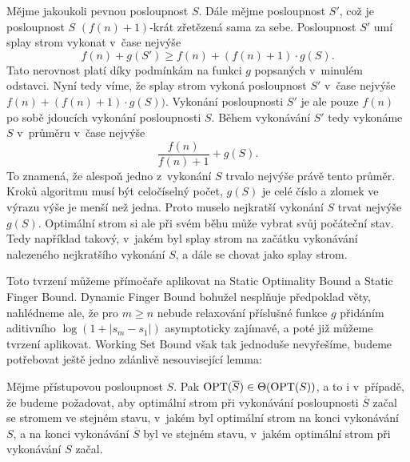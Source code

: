 \begin{dukaz}
Mějme jakoukoli pevnou posloupnost $S$. Dále mějme posloupnost $S'$, což je posloupnost $S$ $(f(n)+1)$-krát zřetězená sama za sebe. Posloupnost $S'$ umí splay strom
vykonat v~čase nejvýše $$f(n) + g(S') \geq f(n) + (f(n)+1) \cdot g(S).$$ Tato
nerovnost platí díky podmínkám na funkci $g$ popsaných v~minulém odstavci. Nyní
tedy víme, že splay strom vykoná posloupnost $S'$ v~čase nejvýše
$f(n)+(f(n)+1)\cdot g(S))$. Vykonání posloupnosti $S'$ je ale pouze $f(n)$ po
sobě jdoucích vykonání posloupnosti $S$. Během vykonávání $S'$ tedy vykonáme
$S$ v~průměru v~čase nejvýše $$\frac{f(n)}{f(n)+1}+g(S).$$ To znamená, že
alespoň jedno z~vykonání $S$ trvalo nejvýše právě tento průměr.
Kroků algoritmu musí být celočíselný počet, $g(S)$ je celé číslo a zlomek ve výrazu
výše je menší než jedna. Proto muselo nejkratší vykonání $S$ trvat nejvýše $g(S)$.
Optimální strom si ale při svém běhu může vybrat svůj počáteční stav. Tedy například takový, v~jakém byl splay strom na začátku
vykonávání nalezeného nejkratšího vykonání $S$, a dále se chovat jako
splay strom.
\end{dukaz}

Toto tvrzení můžeme přímočaře aplikovat na Static Optimality Bound a Static
Finger Bound. Dynamic Finger Bound bohužel nesplňuje předpoklad věty, nahlédneme ale, že pro $m\geq n$ nebude relaxování příslušné funkce $g$
přidáním aditivního $\log(1+|s_{m} - s_{1}|)$ asymptoticky zajímavé, a poté již
můžeme tvrzení aplikovat. Working Set Bound však tak jednoduše nevyřešíme,
budeme potřebovat ještě jedno zdánlivě nesouvisející lemma:

\begin{lemma}
Mějme přístupovou posloupnost $S$. Pak $\operatorname{OPT}(\overline S) \in \Theta(\operatorname{OPT}(S))$,
a to i v~případě, že budeme požadovat, aby optimální strom při vykonávání
posloupnosti $\overline{S}$ začal se stromem ve stejném stavu, v~jakém byl
optimální strom na konci vykonávání $S$, a na konci vykonávání $\overline S$ byl ve
stejném stavu, v~jakém optimální strom při vykonávání $S$ začal.  \end{lemma}


